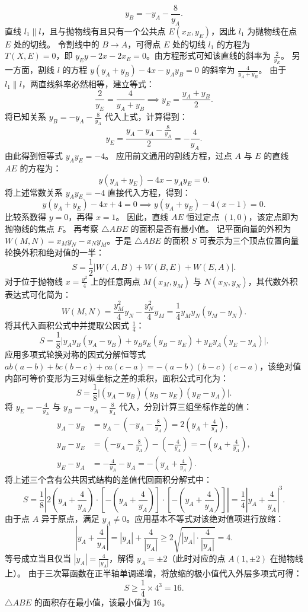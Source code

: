 \begin{solution}
\[ y_B = -y_A - \frac{8}{y_A}. \]
直线 $l_1 \parallel l$，且与抛物线有且只有一个公共点 $E(x_E, y_E)$，因此 $l_1$ 为抛物线在点 $E$ 处的切线。
令割线中的 $B \to A$，可得点 $E$ 处的切线 $l_1$ 的方程为 $T(X, E) = 0$，即 $y_E y - 2x - 2x_E = 0$。由方程形式可知该直线的斜率为 $\frac{2}{y_E}$。
另一方面，割线 $l$ 的方程 $y(y_A + y_B) - 4x - y_A y_B = 0$ 的斜率为 $\frac{4}{y_A + y_B}$。
由于 $l_1 \parallel l$，两直线斜率必然相等，建立等式：
\[ \frac{2}{y_E} = \frac{4}{y_A + y_B} \implies y_E = \frac{y_A + y_B}{2}. \]
将已知关系 $y_B = -y_A - \frac{8}{y_A}$ 代入上式，计算得到：
\[ y_E = \frac{y_A - y_A - \frac{8}{y_A}}{2} = -\frac{4}{y_A}. \]
由此得到恒等式 $y_A y_E = -4$。
应用前文通用的割线方程，过点 $A$ 与 $E$ 的直线 $AE$ 的方程为：
\[ y(y_A + y_E) - 4x - y_A y_E = 0. \]
将上述常数关系 $y_A y_E = -4$ 直接代入方程，得到：
\[ y(y_A + y_E) - 4x + 4 = 0 \implies y(y_A + y_E) - 4(x - 1) = 0. \]
比较系数得 $y = 0$，再得 $x = 1$。
因此，直线 $AE$ 恒过定点 $(1, 0)$，该定点即为抛物线的焦点 $F$。
再考察 $\triangle ABE$ 的面积是否有最小值。
记平面向量的外积为 $W(M, N) = x_M y_N - x_N y_M$。于是 $\triangle ABE$ 的面积 $S$ 可表示为三个顶点位置向量轮换外积和绝对值的一半：
\[ S = \frac{1}{2} \big| W(A, B) + W(B, E) + W(E, A) \big|. \]
对于位于抛物线 $x = \frac{y^2}{4}$ 上的任意两点 $M(x_M, y_M)$ 与 $N(x_N, y_N)$，其代数外积表达式可化简为：
\[ W(M, N) = \frac{y_M^2}{4} y_N - \frac{y_N^2}{4} y_M = \frac{1}{4} y_M y_N (y_M - y_N). \]
将其代入面积公式中并提取公因式 $\frac{1}{4}$：
\[ S = \frac{1}{8} \big| y_A y_B(y_A - y_B) + y_B y_E(y_B - y_E) + y_E y_A(y_E - y_A) \big|. \]
应用多项式轮换对称的因式分解恒等式 $ab(a-b) + bc(b-c) + ca(c-a) = -(a-b)(b-c)(c-a)$，该绝对值内部可等价变形为三对纵坐标之差的乘积，面积公式可化为：
\[ S = \frac{1}{8} \big| (y_A - y_B)(y_B - y_E)(y_E - y_A) \big|. \]
将 $y_E = -\frac{4}{y_A}$ 与 $y_B = -y_A - \frac{8}{y_A}$ 代入，分别计算三组坐标作差的值：
\begin{align*}
y_A - y_B &= y_A - \left(-y_A - \frac{8}{y_A}\right) = 2\left(y_A + \frac{4}{y_A}\right), \\
y_B - y_E &= \left(-y_A - \frac{8}{y_A}\right) - \left(-\frac{4}{y_A}\right) = -\left(y_A + \frac{4}{y_A}\right), \\
y_E - y_A &= -\frac{4}{y_A} - y_A = -\left(y_A + \frac{4}{y_A}\right).
\end{align*}
将上述三个含有公共因式结构的差值代回面积分解式中：
\[ S = \frac{1}{8} \left| 2\left(y_A + \frac{4}{y_A}\right) \cdot \left[-\left(y_A + \frac{4}{y_A}\right)\right] \cdot \left[-\left(y_A + \frac{4}{y_A}\right)\right] \right| = \frac{1}{4} \left| y_A + \frac{4}{y_A} \right|^3. \]
由于点 $A$ 异于原点，满足 $y_A \neq 0$。应用基本不等式对该绝对值项进行放缩：
\[ \left| y_A + \frac{4}{y_A} \right| = |y_A| + \frac{4}{|y_A|} \ge 2\sqrt{|y_A| \cdot \frac{4}{|y_A|}} = 4. \]
等号成立当且仅当 $|y_A| = \frac{4}{|y_A|}$，解得 $y_A = \pm 2$（此时对应的点 $A(1, \pm 2)$ 在抛物线上）。
由于三次幂函数在正半轴单调递增，将放缩的极小值代入外层多项式可得：
\[ S \ge \frac{1}{4} \times 4^3 = 16. \]
$\triangle ABE$ 的面积存在最小值，该最小值为 $16$。
\end{solution}




